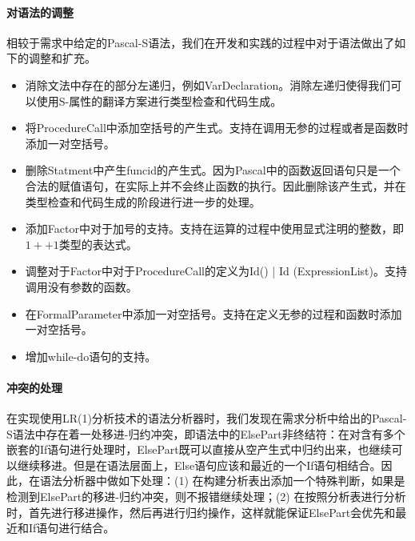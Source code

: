\documentclass[../main.tex]{subfiles}
\begin{document}
\paragraph{对语法的调整} 相较于需求中给定的Pascal-S语法，我们在开发和实践的过程中对于语法做出了如下的调整和扩充。

\begin{itemize}
    \item 消除文法中存在的部分左递归，例如VarDeclaration。消除左递归使得我们可以使用S-属性的翻译方案进行类型检查和代码生成。
    \item 将ProcedureCall中添加空括号的产生式。支持在调用无参的过程或者是函数时添加一对空括号。
    \item 删除Statment中产生funcid的产生式。因为Pascal中的函数返回语句只是一个合法的赋值语句，在实际上并不会终止函数的执行。因此删除该产生式，并在类型检查和代码生成的阶段进行进一步的处理。
    \item 添加Factor中对于加号的支持。支持在运算的过程中使用显式注明的整数，即$ 1 ++ 1$类型的表达式。
    \item 调整对于Factor中对于ProcedureCall的定义为Id() | Id (ExpressionList)。支持调用没有参数的函数。
    \item 在FormalParameter中添加一对空括号。支持在定义无参的过程和函数时添加一对空括号。
    \item 增加while-do语句的支持。
\end{itemize}

\paragraph{冲突的处理} 在实现使用LR(1)分析技术的语法分析器时，我们发现在需求分析中给出的Pascal-S语法中存在着一处移进-归约冲突，即语法中的ElsePart非终结符：在对含有多个嵌套的If语句进行处理时，ElsePart既可以直接从空产生式中归约出来，也继续可以继续移进。但是在语法层面上，Else语句应该和最近的一个If语句相结合。因此，在语法分析器中做如下处理：(1) 在构建分析表出添加一个特殊判断，如果是检测到ElsePart的移进-归约冲突，则不报错继续处理；(2) 在按照分析表进行分析时，首先进行移进操作，然后再进行归约操作，这样就能保证ElsePart会优先和最近和If语句进行结合。
\end{document}

